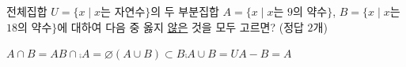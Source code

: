 전체집합 $U=\{x \mid x$는 자연수$\}$의 두 부분집합 $A=\{x \mid x$는 $9$의 약수$\}$, $B=\{x \mid x$는 $18$의 약수$\}$에 대하여 다음 중 옳지 \underline{않은} 것을 모두 고르면? (정답 $2$개)
\begin{choices32}{$A\cap B=A$}{$B\cap\comp{A}=\varnothing$}{$(A\cup B)\subset B$}{$\comp{A}\cup B=U$}{$A-B=A$}\end{choices32}
